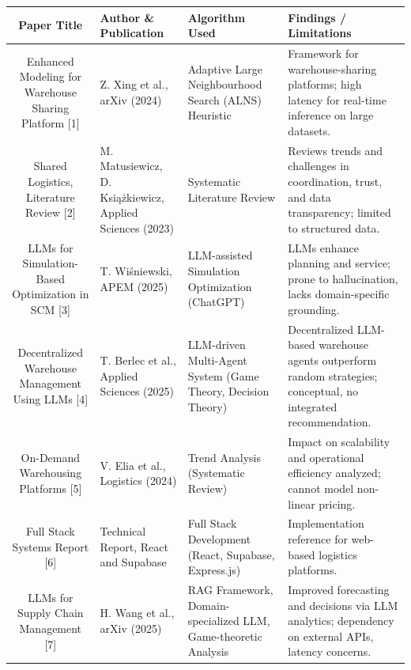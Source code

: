 \documentclass[pdflatex,sn-mathphys-num]{sn-jnl}
\theoremstyle{thmstyleone}
\theoremstyle{thmstyletwo}
\theoremstyle{thmstylethree}
\begin{document}

\begin{table}[h]
\label{tab:literature_survey}
\centering
\footnotesize
\renewcommand{\arraystretch}{1.25}
\setlength{\tabcolsep}{2pt}
\begin{tabular}{|c|p{4cm}|p{3cm}|p{4cm}|}
\hline
\textbf{Paper Title}
  & \textbf{Author \& Publication}
  & \textbf{Algorithm Used}
  & \textbf{Findings / Limitations} \\
\hline

Enhanced Modeling for Warehouse Sharing Platform [1]
  & Z. Xing et al., arXiv (2024)
  & Adaptive Large Neighbourhood Search (ALNS) Heuristic
  & Framework for warehouse-sharing platforms;
    high latency for real-time inference on large datasets. \\
\hline

Shared Logistics, Literature Review [2]
  & M. Matusiewicz, D. Ksi\k{a}\.zkiewicz,
    Applied Sciences (2023)
  & Systematic Literature Review
  & Reviews trends and challenges in coordination,
    trust, and data transparency;
    limited to structured data. \\
\hline

LLMs for Simulation-Based Optimization in SCM [3]
  & T. Wi\'{s}niewski, APEM (2025)
  & LLM-assisted Simulation Optimization (ChatGPT)
  & LLMs enhance planning and service;
    prone to hallucination,
    lacks domain-specific grounding. \\
\hline

Decentralized Warehouse Management Using LLMs [4]
  & T. Berlec et al.,
    Applied Sciences (2025)
  & LLM-driven Multi-Agent System
    (Game Theory, Decision Theory)
  & Decentralized LLM-based warehouse agents
    outperform random strategies;
    conceptual, no integrated recommendation. \\
\hline

On-Demand Warehousing Platforms [5]
  & V. Elia et al., Logistics (2024)
  & Trend Analysis (Systematic Review)
  & Impact on scalability and operational
    efficiency analyzed;
    cannot model non-linear pricing. \\
\hline

Full Stack Systems Report [6]
  & Technical Report,
    React and Supabase
  & Full Stack Development
    (React, Supabase, Express.js)
  & Implementation reference for web-based
    logistics platforms. \\
\hline

LLMs for Supply Chain Management [7]
  & H. Wang et al., arXiv (2025)
  & RAG Framework,
    Domain-specialized LLM,
    Game-theoretic Analysis
  & Improved forecasting and decisions
    via LLM analytics;
    dependency on external APIs,
    latency concerns. \\
\hline


\end{tabular}
\end{table}
\end{document}
